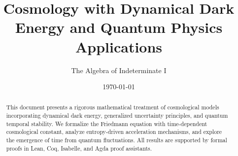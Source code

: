 \documentclass[12pt,a4paper]{article}
\title{Cosmology with Dynamical Dark Energy and Quantum Physics Applications}
\author{The Algebra of Indeterminate I}
\date{\today}
\theoremstyle{definition}
\begin{document}
\maketitle

\begin{abstract}
This document presents a rigorous mathematical treatment of cosmological models incorporating dynamical dark energy, generalized uncertainty principles, and quantum temporal stability. We formalize the Friedmann equation with time-dependent cosmological constant, analyze entropy-driven acceleration mechanisms, and explore the emergence of time from quantum fluctuations. All results are supported by formal proofs in Lean, Coq, Isabelle, and Agda proof assistants.
\end{abstract}

\tableofcontents











\end{document}
